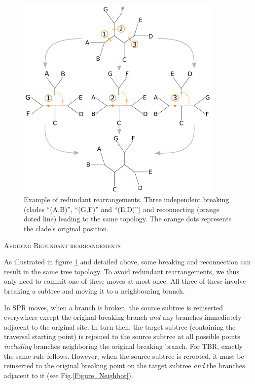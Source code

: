 \documentclass[12pt,letterpaper]{article}
\renewcommand{\section}[1]{%
\bigskip
\begin{center}
\begin{Large}
\normalfont\scshape #1
\medskip
\end{Large}
\end{center}}
\begin{document}
\begin{figure}[!htbp]
\centering
   \includegraphics[width=0.9\textwidth]{Figure/Figure_Redundantswaps.pdf}
\caption{Example of redundant rearrangements. Three independent breaking (clades ``(A,B)'', ``(G,F)'' and ``(E,D)'') and reconnecting (orange doted line) leading to the same topology. The orange dots represents the clade's original position.}
\label{Figure_redundant}
\end{figure}

\section{Avoiding Redundant rearrangements}
As illustrated in figure \ref{Figure_redundant} and detailed above, some breaking and reconnection can result in the same tree topology.
To avoid redundant rearrangements, we thus only need to commit one of these moves at most once.
All three of these involve breaking a subtree and moving it to a neighbouring branch. 

In SPR moves, when a branch is broken, the source subtree is reinserted everywhere except the original breaking branch \textit{and} any branches immediately adjacent to the original site. 
In turn then, the target subtree (containing the traversal starting point) is rejoined to the source subtree at all possible points \textit{including} branches neighboring the original breaking branch.
For TBR, exactly the same rule follows. 
However, when the source subtree is rerooted, it must be reinserted to the original breaking point on the target subtree \textit{and} the branches adjacent to it (see Fig.\ref{Figure_Neighbor}).
\end{document}
